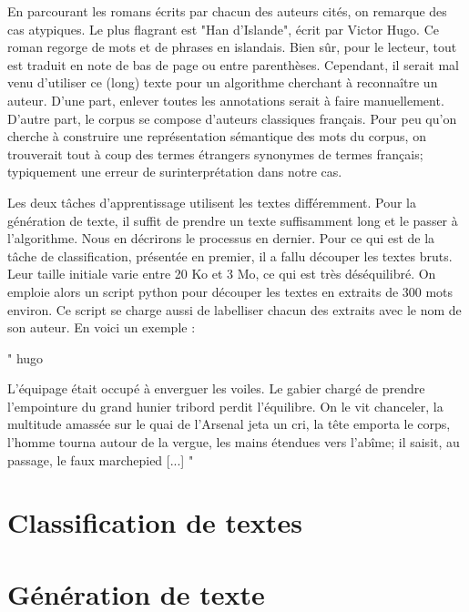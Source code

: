 En parcourant les romans écrits par chacun des auteurs cités, on remarque des cas atypiques. Le plus flagrant est "Han d'Islande", écrit par Victor Hugo. Ce roman regorge de mots et de phrases en islandais. Bien sûr, pour le lecteur, tout est traduit en note de bas de page ou entre parenthèses. Cependant, il serait mal venu d'utiliser ce (long) texte pour un algorithme cherchant à reconnaître un auteur. D'une part, enlever toutes les annotations serait à faire manuellement. D'autre part, le corpus se compose d'auteurs classiques français. Pour peu qu'on cherche à construire une représentation sémantique des mots du corpus, on trouverait tout à coup des termes étrangers synonymes de termes français; typiquement une erreur de surinterprétation dans notre cas.

Les deux tâches d'apprentissage utilisent les textes différemment. Pour la génération de texte, il suffit de prendre un texte suffisamment long et le passer à l'algorithme. Nous en décrirons le processus en dernier. Pour ce qui est de la tâche de classification, présentée en premier, il a fallu découper les textes bruts. Leur taille initiale varie entre 20 Ko et 3 Mo, ce qui est très déséquilibré. On emploie alors un script python pour découper les textes en extraits de 300 mots environ. Ce script se charge aussi de labelliser chacun des extraits avec le nom de son auteur. En voici un exemple :

"
hugo


L'équipage était occupé à enverguer les voiles. Le gabier chargé de
prendre l'empointure du grand hunier tribord perdit l'équilibre. On le
vit chanceler, la multitude amassée sur le quai de l'Arsenal jeta un
cri, la tête emporta le corps, l'homme tourna autour de la vergue, les
mains étendues vers l'abîme; il saisit, au passage, le faux marchepied [...]
"


\section{Classification de textes}


\section{Génération de texte}

